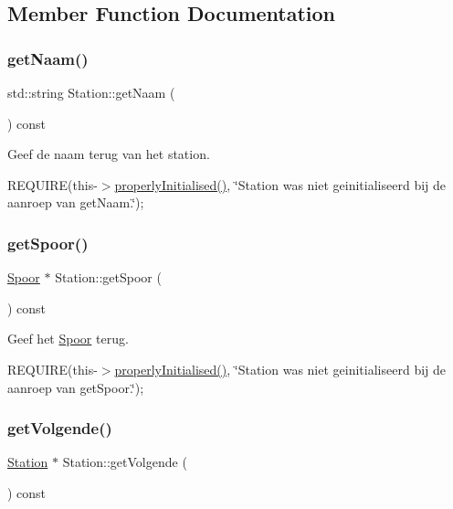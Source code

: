 \subsection{Member Function Documentation}
\mbox{\label{class_station_aea6c31c39a5e1eb4c30337e7ce489e69}} 
\subsubsection{\texorpdfstring{get\+Naam()}{getNaam()}}
{\footnotesize\ttfamily std\+::string Station\+::get\+Naam (\begin{DoxyParamCaption}{ }\end{DoxyParamCaption}) const}



Geef de naam terug van het station. 

R\+E\+Q\+U\+I\+RE(this-\/$>$\hyperlink{class_station_a9ce626dd0599e3ea8107404a59c21e16}{properly\+Initialised()}, \char`\"{}\+Station was niet geinitialiseerd bij de aanroep van get\+Naam.\char`\"{});~\newline
\mbox{\label{class_station_a5230690094cdfd1e9f443d76f35c8a19}} 
\subsubsection{\texorpdfstring{get\+Spoor()}{getSpoor()}}
{\footnotesize\ttfamily \hyperlink{class_spoor}{Spoor} $\ast$ Station\+::get\+Spoor (\begin{DoxyParamCaption}{ }\end{DoxyParamCaption}) const}



Geef het \hyperlink{class_spoor}{Spoor} terug. 

R\+E\+Q\+U\+I\+RE(this-\/$>$\hyperlink{class_station_a9ce626dd0599e3ea8107404a59c21e16}{properly\+Initialised()}, \char`\"{}\+Station was niet geinitialiseerd bij de aanroep van get\+Spoor.\char`\"{});~\newline
\mbox{\label{class_station_a330c297adddcbfd5d8871075291e9512}} 
\subsubsection{\texorpdfstring{get\+Volgende()}{getVolgende()}}
{\footnotesize\ttfamily \hyperlink{class_station}{Station} $\ast$ Station\+::get\+Volgende (\begin{DoxyParamCaption}{ }\end{DoxyParamCaption}) const}



